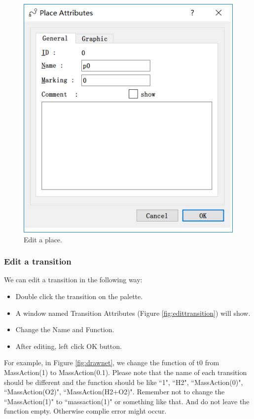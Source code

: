 \documentclass[journal,a4paper,onecolumn]{article}
\begin{document}
\begin{figure}[!hbt]
	\begin{center}
		\includegraphics[width=\columnwidth]{fig3}
		\caption{Edit a place.}
		\label{fig:editplace}
	\end{center}
\end{figure}


\subsubsection{Edit a transition}
We can edit a transition in the following way:

\begin{itemize}
	\item Double click the transition on the palette.
	\item A window named Transition Attributes (Figure \ref{fig:edittransition}) will show.
	\item Change the Name and Function.
	\item After editing, left click OK button.
\end{itemize}

For example, in Figure \ref{fig:drawnet}, we change the function of t0 from MassAction(1) to MassAction(0.1). Please note that the name of each transition should be different and the function should be like ``1", ``H2", ``MassAction(0)", ``MassAction(O2)", ``MassAction(H2+O2)". Remember not to change the ``MassAction(1)" to ``massaction(1)" or something like that. And do not leave the function empty. Otherwise complie error might occur.
\end{document}
